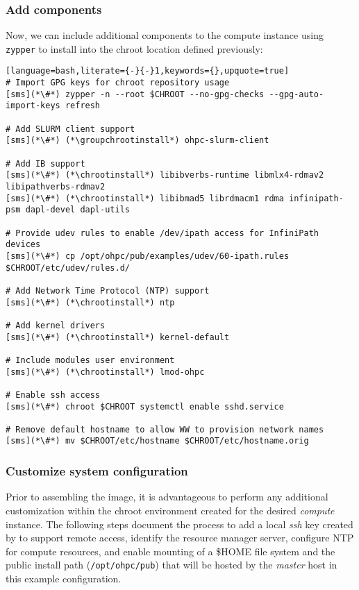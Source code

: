 \documentclass[letterpaper]{article}
\newcommand{\chrootinstall}{zypper -n --root \$CHROOT install}
\newcommand{\groupchrootinstall}{zypper -n --root \$CHROOT install -t pattern}
\begin{document}
\subsubsection{Add \OHPC{} components} \label{sec:add_components}



\noindent Now, we can include additional components to the compute instance using
\texttt{zypper} to install into the chroot location defined previously:

\clearpage
\begin{lstlisting}[language=bash,literate={-}{-}1,keywords={},upquote=true]
# Import GPG keys for chroot repository usage
[sms](*\#*) zypper -n --root $CHROOT --no-gpg-checks --gpg-auto-import-keys refresh

# Add SLURM client support
[sms](*\#*) (*\groupchrootinstall*) ohpc-slurm-client

# Add IB support
[sms](*\#*) (*\chrootinstall*) libibverbs-runtime libmlx4-rdmav2 libipathverbs-rdmav2
[sms](*\#*) (*\chrootinstall*) libibmad5 librdmacm1 rdma infinipath-psm dapl-devel dapl-utils

# Provide udev rules to enable /dev/ipath access for InfiniPath devices
[sms](*\#*) cp /opt/ohpc/pub/examples/udev/60-ipath.rules $CHROOT/etc/udev/rules.d/

# Add Network Time Protocol (NTP) support
[sms](*\#*) (*\chrootinstall*) ntp

# Add kernel drivers
[sms](*\#*) (*\chrootinstall*) kernel-default

# Include modules user environment
[sms](*\#*) (*\chrootinstall*) lmod-ohpc

# Enable ssh access 
[sms](*\#*) chroot $CHROOT systemctl enable sshd.service

# Remove default hostname to allow WW to provision network names
[sms](*\#*) mv $CHROOT/etc/hostname $CHROOT/etc/hostname.orig
\end{lstlisting}

\subsubsection{Customize system configuration} \label{sec:master_customization}

Prior to assembling the image, it is advantageous to perform any additional
customization within the chroot environment created for the desired {\em
 compute} instance. The following steps document the process to add a local
{\em ssh} key created by \Warewulf{} to support remote access, identify the
resource manager server, configure NTP for compute resources, and enable \NFS{}
mounting of a \$HOME file system and the public \OHPC{} install path
(\texttt{/opt/ohpc/pub}) that will be hosted by the {\em master} host in this
example configuration.
\end{document}
